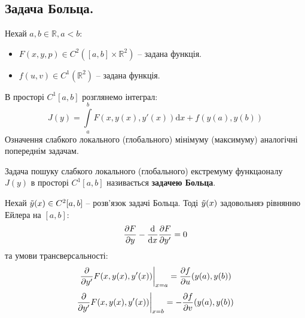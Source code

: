  \subsection{Задача Больца.}
 Нехай $a,b \in \mathbb{R}, a < b$:
 \begin{itemize}
   \item $F(x,y,p) \in C^2([a,b] \times \mathbb{R}^2)$ -- задана функція.
   \item $f(u,v) \in C^1 (\mathbb{R}^2)$ -- задана функція.
 \end{itemize}
 В просторі $C^1[a,b]$ розглянемо інтеграл:
 $$
 J(y) =  \int\limits_{a}^{b}{F(x,y(x), y'(x))} \mathrm{d} x + f(y(a), y(b))
 $$
Означення слабкого локального (глобального) мінімуму (максимуму) аналогічні попереднім задачам.
\begin{defo}
 Задача пошуку слабкого локального (глобального) екстремуму функцаоналу $J(y)$ в просторі $C^1 [a,b]$ називається \textbf{задачею Больца}.
\end{defo}
\begin{boxteo}
Нехай $\tilde{y} (x) \in C^2  [a,b]$  -- розв'язок задачі Больца. Тоді $\tilde{y}(x)$ задовольняэ рівнянню Ейлера на $[a,b]$:
$$
\frac{\partial F}{ \partial y} - \frac{\mathrm{d}}{\mathrm{d} x} \frac{\partial F}{\partial y'} = 0
$$
та умови трансверсальності:
$$
\frac{\partial }{\partial y'} F (x, y(x), y'(x)) \bigg|_{x = a}  = \frac{\partial f}{\partial u} (y(a), y(b))
$$
$$
\frac{\partial }{\partial y'} F (x, y(x), y'(x)) \bigg|_{x = b}  = -\frac{\partial f}{\partial v} (y(a), y(b))
$$
\end{boxteo}
